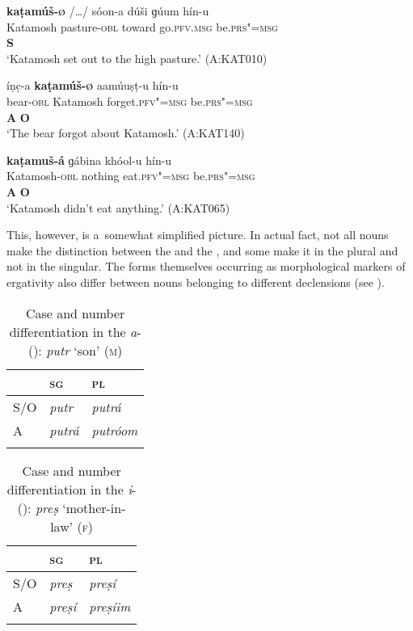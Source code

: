 \begin{exe}
\ex
\label{ex:11-8}
\glll \textbf{kaṭamúš-\textsc{ø}} /{\ldots}/ sóon-a dúši ɡúum  hín-u \\
Katamosh {} pasture-\textsc{obl} toward go.\textsc{pfv.msg}  be.\textsc{prs"=msg} \\
\textbf{S} \\
\glt `Katamosh set out to the high pasture.' (A:KAT010)

\ex
\label{ex:11-9}
\glll íṇc̣-a \textbf{kaṭamúš-\textsc{ø}} aamúuṣṭ-u hín-u \\
bear-\textsc{obl} Katamosh forget.\textsc{pfv"=msg} be.\textsc{prs"=msg} \\
 \textbf{A} \textbf{O} \\
\glt `The bear forgot about Katamosh.' (A:KAT140)

\ex
\label{ex:11-10}
\glll \textbf{kaṭamuš-á} ɡábina khóol-u hín-u \\
Katamosh-\textsc{obl} nothing eat.\textsc{pfv"=msg} be.\textsc{prs"=msg} \\
 \textbf{A} \textbf{O} \\
\glt `Katamosh didn't eat anything.' (A:KAT065)
\end{exe}

This, however, is a~somewhat simplified picture. In actual fact, not all nouns make the distinction between the  and the , and some make it in the plural and not in the singular. The forms themselves occurring as morphological markers of ergativity also differ between nouns belonging to different declensions (see ). 



\begin{table}[p]
\caption{Case and number differentiation in the \textit{a}- (): \textit{putr} `son' \textsc{(m)}} 
\begin{tabularx}{\textwidth}{ Q Q Q }
\lsptoprule
&
\textsc{sg} &
\textsc{pl}\\\midrule
S/O &
\textit{putr} &
\textit{putrá} \\
A &
\textit{putrá} &
\textit{putróom}\\\lspbottomrule
\end{tabularx}
\label{tab:11-adecl}
\end{table}


\begin{table}[p]
\caption{Case and number differentiation in the \textit{i}- (): \textit{preṣ} `mother-in-law' \textsc{(f)}}
\begin{tabularx}{\textwidth}{ Q Q Q }
\lsptoprule
&
\textsc{sg} &
\textsc{pl}\\\midrule
S/O &
\textit{preṣ} &
\textit{preṣí} \\
A &
\textit{preṣí} &
\textit{preṣíim} \\\lspbottomrule
\end{tabularx}
\label{tab:11-idecl}
\end{table}



